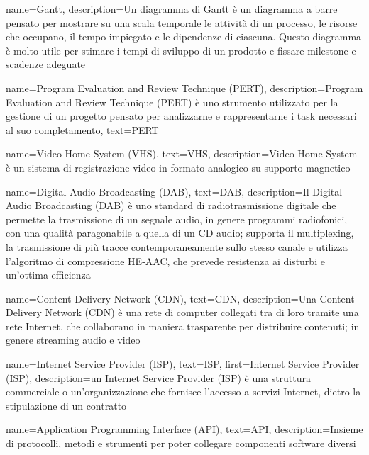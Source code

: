 {
    name={Gantt},
    description={Un diagramma di Gantt è un diagramma a barre pensato per mostrare su una scala temporale le attività di un processo, le risorse che occupano, il tempo impiegato e le dipendenze di ciascuna. Questo diagramma è molto utile per stimare i tempi di sviluppo di un prodotto e fissare milestone e scadenze adeguate}
}

{
    name={Program Evaluation and Review Technique (PERT)},
    description={Program Evaluation and Review Technique (PERT) è uno strumento utilizzato per la gestione di un progetto pensato per analizzarne e rappresentarne i task necessari al suo completamento},
    text={PERT}
}

{
    name={Video Home System (VHS)},
    text={VHS},
    description={Video Home System è un sistema di registrazione video in formato analogico su supporto magnetico}
}

{
    name={Digital Audio Broadcasting (DAB)},
    text={DAB},
    description={Il Digital Audio Broadcasting (DAB) è uno standard di radiotrasmissione digitale che permette la trasmissione di un segnale audio, in genere programmi radiofonici, con una qualità paragonabile a quella di un \gls{CD} audio; supporta il multiplexing, la trasmissione di più tracce contemporaneamente sullo stesso canale e utilizza l'algoritmo di compressione HE-AAC, che prevede resistenza ai disturbi e un'ottima efficienza}
}

{
    name={Content Delivery Network (CDN)},
    text={CDN},
    description={Una Content Delivery Network (CDN) è una rete di computer collegati tra di loro tramite una rete Internet, che collaborano in maniera trasparente per distribuire contenuti; in genere streaming audio e video}
}

{
    name={Internet Service Provider (ISP)},
    text={ISP},
    first={Internet Service Provider (ISP)},
    description={un Internet Service Provider (ISP) è una struttura commerciale o un'organizzazione che fornisce l'accesso a servizi Internet, dietro la stipulazione di un contratto}
}


{
    name={Application Programming Interface (API)},
    text={API},
    description={Insieme di protocolli, metodi e strumenti per poter collegare componenti software diversi}
}

